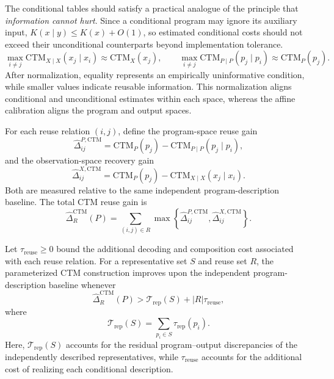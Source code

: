 \documentclass{article}
\begin{document}
The conditional tables should satisfy a practical analogue of the principle that \emph{information cannot hurt}. Since a conditional program may ignore its auxiliary input, \(K(x\mid y)\leq K(x)+O(1)\), so estimated conditional costs should not exceed their unconditional counterparts beyond implementation tolerance.
\[
\max_{i\neq j}
\mathrm{CTM}_{X\mid X}(x_j\mid x_i)
\approx
\mathrm{CTM}_{X}(x_j),
\qquad
\max_{i\neq j}
\mathrm{CTM}_{P\mid P}(p_j\mid p_i)
\approx
\mathrm{CTM}_{P}(p_j).
\]
After normalization, equality represents an empirically uninformative condition, while smaller values indicate reusable information. This normalization aligns conditional and unconditional estimates within each space, whereas the affine calibration aligns the program and output spaces.

For each reuse relation \((i,j)\), define the program-space reuse gain
\[
\hat{\Delta}_{ij}^{P,\mathrm{CTM}}
=
\mathrm{CTM}_{P}(p_j)
-
\mathrm{CTM}_{P\mid P}(p_j\mid p_i),
\]
and the observation-space recovery gain
\[
\hat{\Delta}_{ij}^{X,\mathrm{CTM}}
=
\mathrm{CTM}_{P}(p_j)
-
\mathrm{CTM}_{X\mid X}(x_j\mid x_i).
\]
Both are measured relative to the same independent program-description baseline. The total CTM reuse gain is
\[
\hat{\Delta}^{\mathrm{CTM}}_R(P)
=
\sum_{(i,j)\in R}
\max
\left\{
\hat{\Delta}_{ij}^{P,\mathrm{CTM}},
\hat{\Delta}_{ij}^{X,\mathrm{CTM}}
\right\}.
\]

Let \(\tau_{\mathrm{reuse}}\geq 0\) bound the additional decoding and composition cost associated with each reuse relation. For a representative set \(S\) and reuse set \(R\), the parameterized CTM construction improves upon the independent program-description baseline whenever
\[
\hat{\Delta}^{\mathrm{CTM}}_R(P)
>
\mathcal T_{\mathrm{rep}}(S)
+
|R|\tau_{\mathrm{reuse}},
\]
where
\[
\mathcal T_{\mathrm{rep}}(S)
=
\sum_{p_i\in S}\tau_{\mathrm{rep}}(p_i).
\]
Here, \(\mathcal T_{\mathrm{rep}}(S)\) accounts for the residual program--output discrepancies of the independently described representatives, while \(\tau_{\mathrm{reuse}}\) accounts for the additional cost of realizing each conditional description.
\end{document}
